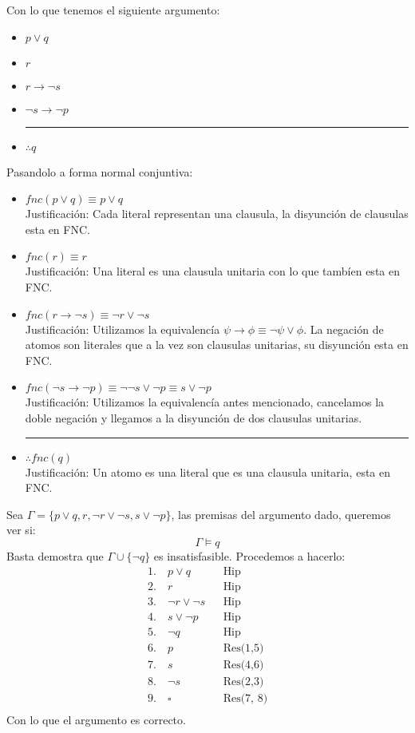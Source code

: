 \documentclass[11pt,letterpaper]{article}
\begin{document}
\begin{enumerate}
    Con lo que tenemos el siguiente argumento:
    \begin{itemize}
    \item $p\lor q$
    \item $r$
    \item $r \rightarrow \neg s$
    \item $\neg s \rightarrow \neg p$\\
      \rule{.3\textwidth}{0.2mm}
    \item $\therefore q$
    \end{itemize}
    Pasandolo a forma normal conjuntiva:
    \begin{itemize}
    \item $fnc(p\lor q) \equiv p\lor q$ \\
      Justificación: Cada literal representan una clausula, la disyunción
      de clausulas esta en FNC.
    \item $fnc(r) \equiv r$ \\
      Justificación: Una literal es una clausula unitaria con lo que
      tambíen esta en FNC.
    \item $fnc(r \rightarrow \neg s)\equiv \neg r \lor \neg s$ \\
      Justificación: Utilizamos la equivalencía 
      $\psi\rightarrow \phi \equiv \neg \psi \lor \phi$. La negación de
      atomos son literales que a la vez son clausulas unitarias, su disyunción
      esta en FNC.
    \item $fnc(\neg s \rightarrow \neg p) \equiv \neg\neg s\lor\neg p\equiv
      s\lor\neg p$\\
      Justificación: Utilizamos la equivalencía antes mencionado, cancelamos
      la doble negación y llegamos a la disyunción de dos clausulas
      unitarias. \\
      \rule{.3\textwidth}{0.2mm}
    \item $\therefore fnc(q)$\\
      Justificación: Un atomo es una literal que es una clausula
      unitaria, esta en FNC.
    \end{itemize}
  Sea $\Gamma = \{p\lor q, r, \neg r\lor\neg s, s\lor\neg p \}$, las premisas
  del argumento dado, queremos ver si:
  $$ \Gamma\models q$$
  Basta demostra que $ \Gamma\cup\{\neg q\}$ es insatisfasible. Procedemos
  a hacerlo:
  \begin{align*}
    1.\  &p\lor q & &\text{Hip} \\
    2.\  &r & &\text{Hip} \\
    3.\  &\neg r\lor\neg s & &\text{Hip} \\
    4.\  &s\lor\neg p & &\text{Hip} \\
    5.\  &\neg q & &\text{Hip} \\
    6.\  &p & &\text{Res(1,5)}\\
    7.\  &s & &\text{Res(4,6)}\\
    8.\  &\neg s & &\text{Res(2,3)}\\
    9.\  &\square & &\text{Res(7, 8)}\\
  \end{align*}
  Con lo que el argumento es correcto.
\medskip


\end{enumerate}
\end{document}
